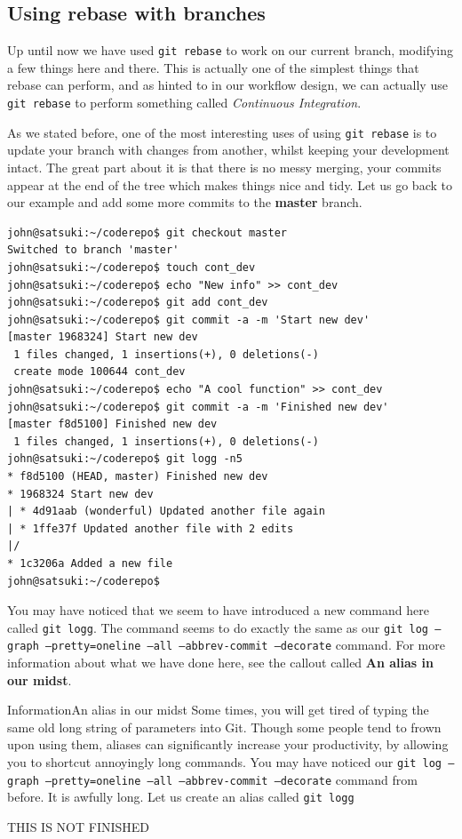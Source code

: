 \subsection{Using rebase with branches}

Up until now we have used \texttt{git rebase} to work on our current branch, modifying a few things here and there.  This is actually one of the simplest things that rebase can perform, and as hinted to in our workflow design, we can actually use \texttt{git rebase} to perform something called \emph{Continuous Integration}.

As we stated before, one of the most interesting uses of using \texttt{git rebase} is to update your branch with changes from another, whilst keeping your development intact.  The great part about it is that there is no messy merging, your commits appear at the end of the tree which makes things nice and tidy.  Let us go back to our example and add some more commits to the \textbf{master} branch.

\begin{Verbatim}
john@satsuki:~/coderepo$ git checkout master
Switched to branch 'master'
john@satsuki:~/coderepo$ touch cont_dev
john@satsuki:~/coderepo$ echo "New info" >> cont_dev 
john@satsuki:~/coderepo$ git add cont_dev
john@satsuki:~/coderepo$ git commit -a -m 'Start new dev'
[master 1968324] Start new dev
 1 files changed, 1 insertions(+), 0 deletions(-)
 create mode 100644 cont_dev
john@satsuki:~/coderepo$ echo "A cool function" >> cont_dev 
john@satsuki:~/coderepo$ git commit -a -m 'Finished new dev'
[master f8d5100] Finished new dev
 1 files changed, 1 insertions(+), 0 deletions(-)
john@satsuki:~/coderepo$ git logg -n5
* f8d5100 (HEAD, master) Finished new dev
* 1968324 Start new dev
| * 4d91aab (wonderful) Updated another file again
| * 1ffe37f Updated another file with 2 edits
|/  
* 1c3206a Added a new file
john@satsuki:~/coderepo$ 
\end{Verbatim}

You may have noticed that we seem to have introduced a new command here called \texttt{git logg}.  The command seems to do exactly the same as our \texttt{git log --graph --pretty=oneline --all --abbrev-commit --decorate} command.  For more information about what we have done here, see the callout called \textbf{An alias in our midst}.

\begin{callout}{Information}{An alias in our midst}
Some times, you will get tired of typing the same old long string of parameters into Git.  Though some people tend to frown upon using them, aliases can significantly increase your productivity, by allowing you to shortcut annoyingly long commands.  You may have noticed our \texttt{git log --graph --pretty=oneline --all --abbrev-commit --decorate} command from before.  It is awfully long.  Let us create an alias called \texttt{git logg}

THIS IS NOT FINISHED

\end{callout}
